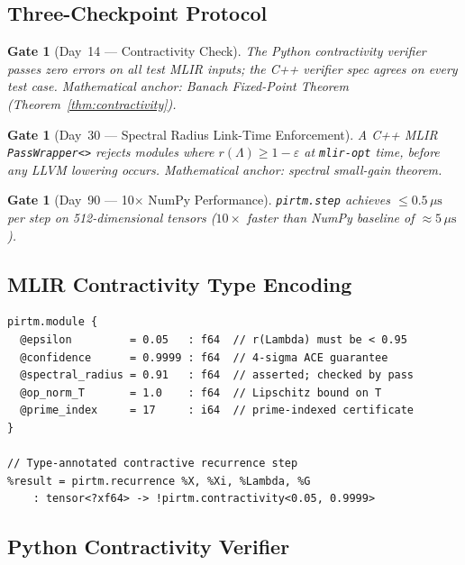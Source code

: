 \documentclass[11pt,letterpaper]{article}
\newtheorem{gatethm}[theorem]{Gate}
\theoremstyle{remark}
\begin{document}
\subsection{Three-Checkpoint Protocol}

\begin{gatethm}[Day~14 --- Contractivity Check]
The Python contractivity verifier passes zero errors on all test MLIR
inputs; the C++ verifier spec agrees on every test case.
Mathematical anchor: Banach Fixed-Point Theorem (Theorem~\ref{thm:contractivity}).
\end{gatethm}

\begin{gatethm}[Day~30 --- Spectral Radius Link-Time Enforcement]
A C++ MLIR \texttt{PassWrapper<>} rejects modules where
$r(\Lambda) \geq 1 - \varepsilon$ at \texttt{mlir-opt} time, before
any LLVM lowering occurs. Mathematical anchor: spectral small-gain theorem.
\end{gatethm}

\begin{gatethm}[Day~90 --- 10$\times$ NumPy Performance]
\texttt{pirtm.step} achieves $\leq 0.5\,\mu\text{s}$ per step on
512-dimensional tensors ($10\times$ faster than NumPy baseline of
$\approx 5\,\mu\text{s}$).
\end{gatethm}

\subsection{MLIR Contractivity Type Encoding}

\begin{lstlisting}[style=mlir, caption={PIRTM module with contractivity metadata}]
pirtm.module {
  @epsilon         = 0.05   : f64  // r(Lambda) must be < 0.95
  @confidence      = 0.9999 : f64  // 4-sigma ACE guarantee
  @spectral_radius = 0.91   : f64  // asserted; checked by pass
  @op_norm_T       = 1.0    : f64  // Lipschitz bound on T
  @prime_index     = 17     : i64  // prime-indexed certificate
}

// Type-annotated contractive recurrence step
%result = pirtm.recurrence %X, %Xi, %Lambda, %G
    : tensor<?xf64> -> !pirtm.contractivity<0.05, 0.9999>
\end{lstlisting}

\subsection{Python Contractivity Verifier}
\end{document}
